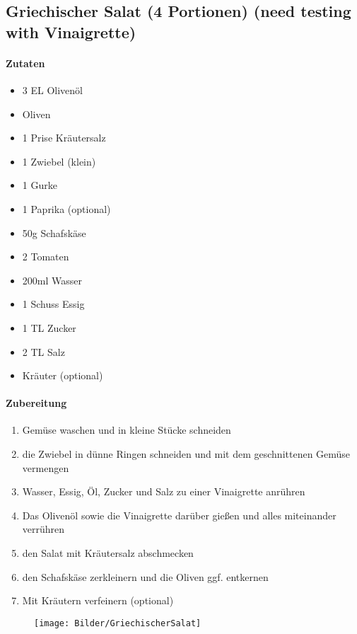 \newpage
\subsection{Griechischer Salat (4 Portionen) (need testing with Vinaigrette)}
\paragraph{Zutaten}
\begin{itemize}[noitemsep]
	\item 3 EL Olivenöl
	\item Oliven
	\item 1 Prise Kräutersalz
	\item 1 Zwiebel (klein)
	\item 1 Gurke
	\item 1 Paprika (optional)
	\item 50g Schafskäse
	\item 2 Tomaten
	\item 200ml Wasser
	\item 1 Schuss Essig
	\item 1 TL Zucker
	\item 2 TL Salz
	\item Kräuter (optional)
\end{itemize}
\paragraph{Zubereitung}
\begin{enumerate}[noitemsep]
	\item Gemüse waschen und in kleine Stücke schneiden
	\item die Zwiebel in dünne Ringen schneiden und mit dem geschnittenen Gemüse vermengen
	\item Wasser, Essig, Öl, Zucker und Salz zu einer Vinaigrette anrühren
	\item Das Olivenöl sowie die Vinaigrette darüber gießen und alles miteinander verrühren
	\item den Salat mit Kräutersalz abschmecken
	\item den Schafskäse zerkleinern und die Oliven ggf. entkernen
	\item Mit Kräutern verfeinern (optional)
\end{enumerate}
\begin{figure}[h]
\centering
\texttt{[image: Bilder/GriechischerSalat]}
\end{figure}